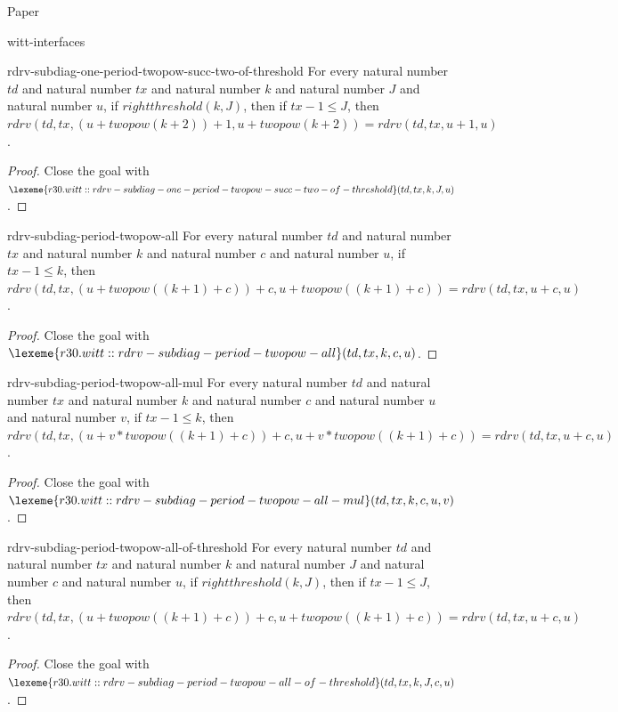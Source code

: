 \begin{lexlean}{Paper}
\begin{section}{witt-interfaces}
  \begin{theorem}{rdrv-subdiag-one-period-twopow-succ-two-of-threshold}
  For every natural number \(td\) and natural number \(tx\) and natural number \(k\) and natural number \(J\) and natural number \(u\), if \(rightthreshold(k, J)\), then if \(tx - 1 ≤ J\), then \(rdrv(td, tx, (u + twopow(k + 2)) + 1, u + twopow(k + 2)) = rdrv(td, tx, u + 1, u)\).
  \begin{proof}
  Close the goal with \(\lexeme{r30.witt::rdrv-subdiag-one-period-twopow-succ-two-of-threshold}(td, tx, k, J, u)\).
  \end{proof}
  \end{theorem}

  \begin{theorem}{rdrv-subdiag-period-twopow-all}
  For every natural number \(td\) and natural number \(tx\) and natural number \(k\) and natural number \(c\) and natural number \(u\), if \(tx - 1 ≤ k\), then \(rdrv(td, tx, (u + twopow((k + 1) + c)) + c, u + twopow((k + 1) + c)) = rdrv(td, tx, u + c, u)\).
  \begin{proof}
  Close the goal with \(\lexeme{r30.witt::rdrv-subdiag-period-twopow-all}(td, tx, k, c, u)\).
  \end{proof}
  \end{theorem}

  \begin{theorem}{rdrv-subdiag-period-twopow-all-mul}
  For every natural number \(td\) and natural number \(tx\) and natural number \(k\) and natural number \(c\) and natural number \(u\) and natural number \(v\), if \(tx - 1 ≤ k\), then \(rdrv(td, tx, (u + v * twopow((k + 1) + c)) + c, u + v * twopow((k + 1) + c)) = rdrv(td, tx, u + c, u)\).
  \begin{proof}
  Close the goal with \(\lexeme{r30.witt::rdrv-subdiag-period-twopow-all-mul}(td, tx, k, c, u, v)\).
  \end{proof}
  \end{theorem}

  \begin{theorem}{rdrv-subdiag-period-twopow-all-of-threshold}
  For every natural number \(td\) and natural number \(tx\) and natural number \(k\) and natural number \(J\) and natural number \(c\) and natural number \(u\), if \(rightthreshold(k, J)\), then if \(tx - 1 ≤ J\), then \(rdrv(td, tx, (u + twopow((k + 1) + c)) + c, u + twopow((k + 1) + c)) = rdrv(td, tx, u + c, u)\).
  \begin{proof}
  Close the goal with \(\lexeme{r30.witt::rdrv-subdiag-period-twopow-all-of-threshold}(td, tx, k, J, c, u)\).
  \end{proof}
  \end{theorem}


\end{section}
\end{lexlean}
